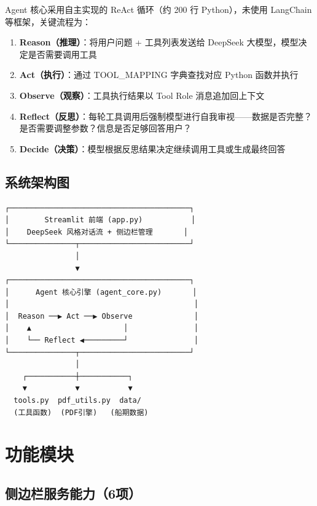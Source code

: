 \documentclass[12pt,a4paper]{ctexart}
\begin{document}
Agent 核心采用自主实现的 ReAct 循环（约 200 行 Python），未使用 LangChain 等框架，关键流程为：

\begin{enumerate}[label=步骤\arabic*：, leftmargin=*]
    \item \textbf{Reason（推理）}：将用户问题 + 工具列表发送给 DeepSeek 大模型，模型决定是否需要调用工具
    \item \textbf{Act（执行）}：通过 TOOL\_MAPPING 字典查找对应 Python 函数并执行
    \item \textbf{Observe（观察）}：工具执行结果以 Tool Role 消息追加回上下文
    \item \textbf{Reflect（反思）}：每轮工具调用后强制模型进行自我审视——数据是否完整？是否需要调整参数？信息是否足够回答用户？
    \item \textbf{Decide（决策）}：模型根据反思结果决定继续调用工具或生成最终回答
\end{enumerate}

\subsection{系统架构图}

\begin{verbatim}
┌─────────────────────────────────────────┐
│        Streamlit 前端 (app.py)           │
│    DeepSeek 风格对话流 + 侧边栏管理       │
└───────────────┬─────────────────────────┘
                │
                ▼
┌─────────────────────────────────────────┐
│      Agent 核心引擎 (agent_core.py)       │
│                                          │
│  Reason ──▶ Act ──▶ Observe              │
│    ▲                     │               │
│    └── Reflect ◀─────────┘               │
└───────────────┬─────────────────────────┘
                │
    ┌───────────┼───────────┐
    ▼           ▼           ▼
  tools.py  pdf_utils.py  data/
  (工具函数)  (PDF引擎)   (船期数据)
\end{verbatim}

\section{功能模块}

\subsection{侧边栏服务能力（6项）}
\end{document}
